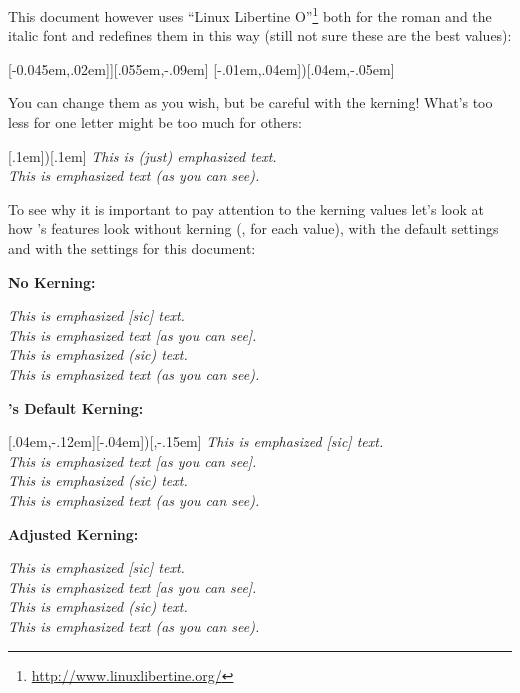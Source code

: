 \documentclass[DIV10,toc=index,toc=bib]{cnpkgdoc}
\begin{document}
This document however uses ``Linux Libertine
O''\footnote{\url{http://www.linuxlibertine.org/}} both for the roman and the
italic font and redefines them in this way (still not sure these are the best
values):
\begin{beispiel}
 \RenewEmph{[}[-0.045em,.02em]{]}[.055em,-.09em]
 \ChangeEmph{(}[-.01em,.04em]{)}[.04em,-.05em]
\end{beispiel}

You can change them as you wish, but be careful with the kerning! What's too
less for one letter might be too much for others:
\begin{beispiel}
 \ChangeEmph{(}[.1em]{)}[.1em]
 \emph{This is (just) emphasized text.} \\ %
 \emph{This is emphasized text (as you can see).} %
\end{beispiel}

To see why it is important to pay attention to the kerning values let's look
at how \embrac's features look without kerning (\ie, \code{0pt} for each
value), with the default settings and with the settings for this document:

\begin{center}
 \begin{minipage}{.5\linewidth}
  \textbf{No Kerning:}
  
  \RenewEmph{[}{]}\RenewEmph{(}{)}
  \emph{This is emphasized [sic] text.} \\
  \emph{This is emphasized text [as you can see].} \\
  \emph{This is emphasized (sic) text.} \\
  \emph{This is emphasized text (as you can see).}
 \end{minipage}\bigskip
 
 \begin{minipage}{.5\linewidth}
  \textbf{\embrac's Default Kerning:}
  
  \RenewEmph{[}{]}[.04em,-.12em]\RenewEmph{(}[-.04em]{)}[,-.15em]
  \emph{This is emphasized [sic] text.} \\
  \emph{This is emphasized text [as you can see].} \\
  \emph{This is emphasized (sic) text.} \\
  \emph{This is emphasized text (as you can see).}
 \end{minipage}\bigskip
 
 \begin{minipage}{.5\linewidth}
  \textbf{Adjusted Kerning:}
  
  \emph{This is emphasized [sic] text.} \\
  \emph{This is emphasized text [as you can see].} \\
  \emph{This is emphasized (sic) text.} \\
  \emph{This is emphasized text (as you can see).}
 \end{minipage}
\end{center}
\end{document}
